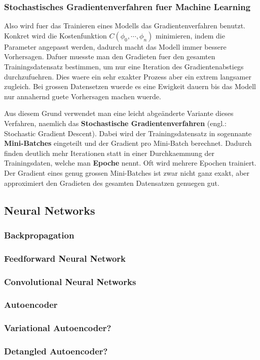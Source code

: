 \documentclass[../main]{subfiles}
\begin{document}
\subsubsection{Stochastisches Gradientenverfahren fuer Machine Learning}
Also wird fuer das Trainieren eines Modells das Gradientenverfahren benutzt.
Konkret wird die Kostenfunktion $C(\phi_0,\cdots,\phi_n)$ minimieren, indem die Parameter angepasst werden, dadurch macht das Modell immer bessere Vorhersagen.
Dafuer muesste man den Gradieten fuer den gesamten Trainingsdatensatz bestimmen, um nur eine Iteration des Gradientenabstiegs durchzufuehren.
Dies waere ein sehr exakter Prozess aber ein extrem langsamer zugleich.
Bei grossen Datensetzen wuerde es eine Ewigkeit dauern bis das Modell nur annahernd guete Vorhersagen machen wuerde.
\par\medskip
Aus diesem Grund verwendet man eine leicht abgeänderte Variante dieses Verfahren, naemlich das \textbf{Stochastische Gradientenverfahren} (engl.: Stochastic Gradient Descent).
Dabei wird der Trainingsdatensatz in sogennante \textbf{Mini-Batches} eingeteilt und der Gradient pro Mini-Batch berechnet.
Dadurch finden deutlich mehr Iterationen statt in einer Durchkaemmung der Trainingsdaten, welche man \textbf{Epoche} nennt. Oft wird mehrere Epochen trainiert. 
Der Gradient eines genug grossen Mini-Batches ist zwar nicht ganz exakt, aber approximiert den Gradieten des gesamten Datensatzen genuegen gut.

\subsection{Neural Networks}
\subsubsection{Backpropagation}
\subsubsection{Feedforward Neural Network}
\subsubsection{Convolutional Neural Networks}
\subsubsection{Autoencoder}
\subsubsection{Variational Autoencoder?}
\subsubsection{Detangled Autoencoder?}
\end{document}
